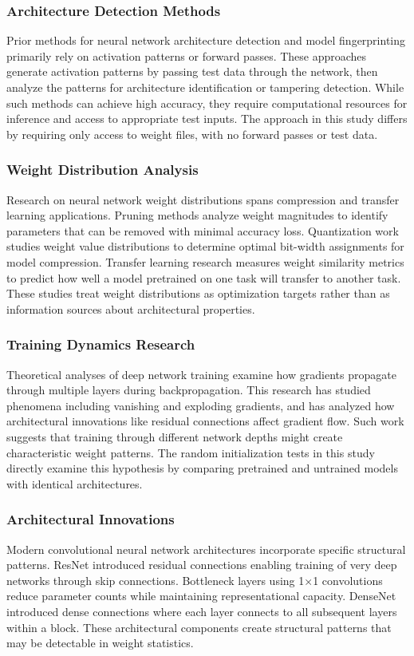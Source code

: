 
\subsubsection{Architecture Detection Methods}

Prior methods for neural network architecture detection and model fingerprinting primarily rely on activation patterns or forward passes. These approaches generate activation patterns by passing test data through the network, then analyze the patterns for architecture identification or tampering detection. While such methods can achieve high accuracy, they require computational resources for inference and access to appropriate test inputs. The approach in this study differs by requiring only access to weight files, with no forward passes or test data.

\subsubsection{Weight Distribution Analysis}

Research on neural network weight distributions spans compression and transfer learning applications. Pruning methods analyze weight magnitudes to identify parameters that can be removed with minimal accuracy loss. Quantization work studies weight value distributions to determine optimal bit-width assignments for model compression. Transfer learning research measures weight similarity metrics to predict how well a model pretrained on one task will transfer to another task. These studies treat weight distributions as optimization targets rather than as information sources about architectural properties.

\subsubsection{Training Dynamics Research}

Theoretical analyses of deep network training examine how gradients propagate through multiple layers during backpropagation. This research has studied phenomena including vanishing and exploding gradients, and has analyzed how architectural innovations like residual connections affect gradient flow. Such work suggests that training through different network depths might create characteristic weight patterns. The random initialization tests in this study directly examine this hypothesis by comparing pretrained and untrained models with identical architectures.

\subsubsection{Architectural Innovations}

Modern convolutional neural network architectures incorporate specific structural patterns. ResNet introduced residual connections enabling training of very deep networks through skip connections. Bottleneck layers using 1×1 convolutions reduce parameter counts while maintaining representational capacity. DenseNet introduced dense connections where each layer connects to all subsequent layers within a block. These architectural components create structural patterns that may be detectable in weight statistics.
